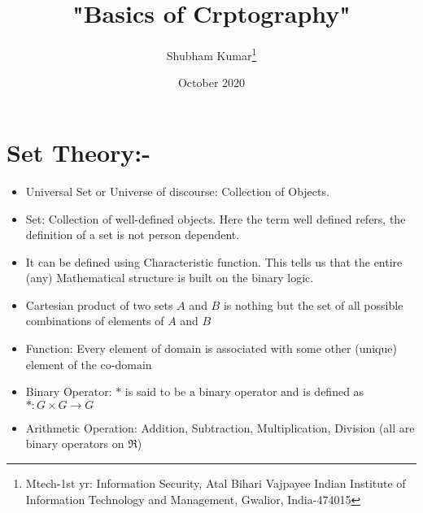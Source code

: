 \documentclass{article}
\title{"Basics of Crptography"}
\author{Shubham Kumar\thanks{Mtech-1st yr: Information Security, Atal Bihari Vajpayee Indian Institute of Information Technology and Management, Gwalior, India-474015} }
\date{October 2020}
\begin{document}
\maketitle


\section{Set Theory:-}
\begin{itemize}
    \item Universal Set or Universe of discourse: Collection of Objects.
	\item Set: Collection of well-defined objects. Here the term well defined refers, the definition of a set is not person dependent.
	\item It can be defined using Characteristic function. This tells us that the entire (any) Mathematical structure is built on the binary logic.
	\item Cartesian product of two sets $A$ and $B$ is nothing but the set of all possible combinations of elements of $A$ and $B$
	\item Function: Every element of domain is associated with some other (unique) element of the co-domain
	\item Binary Operator: $*$ is said to be a binary operator and is defined as $*:G \times G \rightarrow G $
	\item Arithmetic Operation: Addition, Subtraction, Multiplication, Division (all are binary operators on $\Re$)
\end{itemize}
\end{document}
